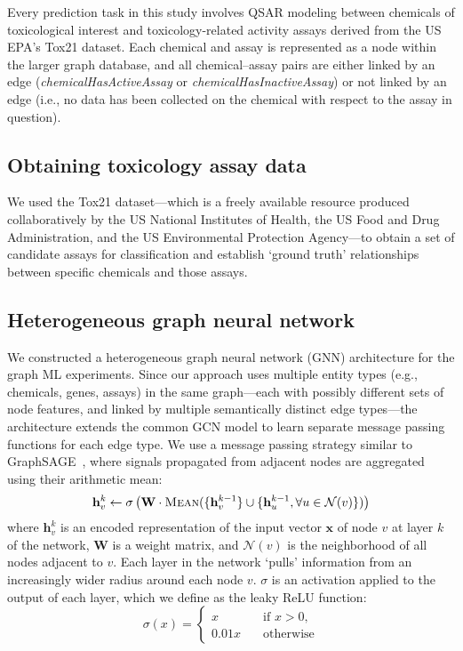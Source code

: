 \documentclass{ws-procs11x85}
\begin{document}
Every prediction task in this study involves QSAR modeling between chemicals of toxicological interest and toxicology-related activity assays derived from the US EPA's Tox21 dataset.
Each chemical and assay is represented as a node within the larger graph database, and all chemical--assay pairs are either linked by an edge (\textit{chemicalHasActiveAssay} or \textit{chemicalHasInactiveAssay}) or not linked by an edge (i.e., no data has been collected on the chemical with respect to the assay in question). 

\subsection{Obtaining toxicology assay data}
We used the Tox21 dataset---which is a freely available resource produced collaboratively by the US National Institutes of Health, the US Food and Drug Administration, and the US Environmental Protection Agency---to obtain a set of candidate assays for classification and establish `ground truth' relationships between specific chemicals and those assays.

\subsection{Heterogeneous graph neural network}
We constructed a heterogeneous graph neural network (GNN) architecture for the graph ML experiments.
Since our approach uses multiple entity types (e.g., chemicals, genes, assays) in the same graph---each with possibly different sets of node features, and linked by multiple semantically distinct edge types---the architecture extends the common GCN model to learn separate message passing functions for each edge type.
We use a message passing strategy similar to GraphSAGE~\cite{hamilton2017inductive}, where signals propagated from adjacent nodes are aggregated using their arithmetic mean:
\begin{equation}
\mathbf{h}_v^k \gets \sigma\left(\mathbf{W} \cdot \textsc{Mean}(\{\mathbf{h}_v^{k-1}\}\cup \{ \mathbf{h}_u^{k-1},\forall u \in \mathcal{N}(v) \})\right)
\end{equation}
where $\mathbf{h}_v^{k}$ is an encoded representation of the input vector $\mathbf{x}$ of node $v$ at layer $k$ of the network, $\mathbf{W}$ is a weight matrix, and $\mathcal{N}(v)$ is the neighborhood of all nodes adjacent to $v$.
Each layer in the network `pulls' information from an increasingly wider radius around each node $v$.
$\sigma$ is an activation applied to the output of each layer, which we define as the leaky ReLU function:
\begin{equation}
\sigma(x) =
\begin{cases}
   x & \quad \text{if } x > 0,\\
   0.01x & \quad \text{otherwise}
\end{cases}
\end{equation}
\end{document}
